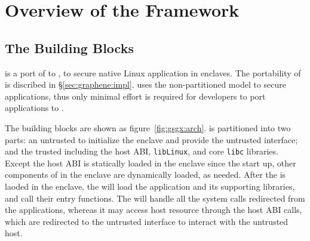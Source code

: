 \section{Overview of the \sysname{} Framework}
\label{sec:overview}

\subsection{The \sysname{} Building Blocks}
\label{sec:overview:arch}

\sysname{} is a port of \graphene{} \libos{} to \sgx{},
to secure native Linux application in \sgx{} enclaves.
The portability of \graphene{} is discribed in \S\ref{sec:graphene:impl}.
\sysname{} uses the non-partitioned model
to secure applications,
thus only minimal effort is required for developers
to port applications to \sysname{}.


The building blocks are shown as figure~\ref{fig:gsgx:arch}.
\sysname{} is partitioned into two parts:
an untrusted \pal{} to initialize the enclave and provide the untrusted interface;
and the trusted \libos{} including the host ABI, {\tt libLinux}, and core {\tt libc} libraries.
Except the host ABI is statically loaded in the enclave since the start up,
other components of \sysname{} in the enclave are dynamically loaded,
as needed. 
After the \libos{} is laoded in the enclave,
the \libos{} will load the application and its supporting libraries,
and call their entry functions.
The \libos{} will handle all the system calls redirected from the applications,
whereas it may access host resource through the host ABI calls,
which are redirected to the untrusted interface
to interact with the untrusted host. 

